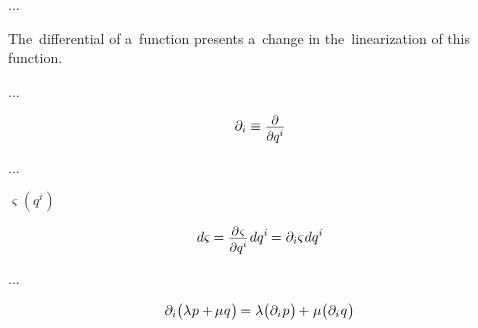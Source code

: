 ...

The~differential of a~function presents a~change in the~linearization of this function.

...


\nopagebreak\vspace{-0.4em}\begin{equation*}
\partial_i \equiv \scalebox{.9}{$ \displaystyle\frac{\raisebox{-0.2em}{$\partial$}}{\raisebox{-0.1em}{$\partial q^i$}} $}
\end{equation*}

...

 ${\varsigma(q^i)}$

\nopagebreak\vspace{-0.4em}\begin{equation}
d\varsigma \hspace{-0.1ex}
= \scalebox{0.9}{$ \displaystyle\frac{\raisebox{-0.2em}{$\partial \hspace{.15ex} \varsigma$}}{\raisebox{-0.1em}{$\partial q^i$}} $} \hspace{.2ex} dq^i \hspace{-0.2ex}
= \partial_i \varsigma \hspace{.15ex} dq^i
\end{equation}

...


\nopagebreak\vspace{-0.4em}\begin{equation}\label{linearityordifferentiation}
\partial_i \bigl( \lambda \hspace{.1ex} p + \hspace{-0.2ex} \mu \hspace{.1ex} q \hspace{.1ex} \bigr) \hspace{-0.2ex}
= \lambda \bigl( \partial_i \hspace{.1ex} p \hspace{.1ex} \bigr) \hspace{-0.2ex} + \hspace{.1ex}
\mu \bigl( \partial_i \hspace{.1ex} q \hspace{.1ex} \bigr)
\end{equation}


